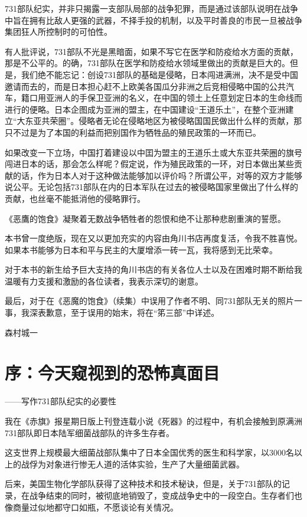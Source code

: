 \documentclass[a4paper,12pt,UTF8,twoside]{ctexbook}
\begin{document}
731部队纪实，并非只揭露一支部队局部的战争犯罪，而是通过该部队说明在战争中旨在拥有比敌人更强的武器，不择手投的机制，以及平时善良的市民一旦被战争集团狂人所控制时的可怕性。

有人批评说，731部队不光是黑暗面，如果不写它在医学和防疫给水方面的贡献，那是不公平的。的确，731部队在医学和防疫给水领域里做出的贡献是巨大的。但是，我们绝不能忘记：创设731部队的基础是侵略，日本闯进满洲，决不是受中国邀请而去的，而是日本担心赶不上欧美各国瓜分非洲之后竞相侵略中国的公共汽车，籍口用亚洲人的手保卫亚洲的名义，在中国的领土上任意划定日本的生命线而进行的便略。日本企图成为亚洲的盟主，在中国建设“王道乐土”，在整个亚洲建立“大东亚共荣圈”。侵略者无论在侵略地区为被侵略国国民做出什么样的贡献，那只不过是为了本国的利益而把别国作为牺牲品的殖民政策的一环而已。

如果改变一下立场，中国打着建设以中囯为盟主的王道乐土或大东亚共荣圈的旗号闯进日本的话，那会怎么样呢？假定说，作为殖民政策的一环，对日本做出某些贡献的话，作为日本人对于这种做法能够加以评价吗？所谓公平，对等的双方才能够说公平。无论包括731部队在内的日本军队在过去的被侵略国家里做出了什么样的贡献，也丝毫不能抵消他的侵略罪行。

《恶鷹的饱食》凝聚着无数战争牺牲者的怨恨和绝不让那种悲剧重演的誓愿。

本书曾一度绝版，现在又以更加充实的内容由角川书店再度复活，令我不胜喜悦。如果本书能够为日本和平与民主的大厦增添一砖一瓦，我将感到无比荣幸。

对于本书的新生给予巨大支持的角川书店的有关各位人士以及在困难时期不断给我温暖有力支援和激励的各位读者，我表示深切的谢意。

最后，对于在《恶魔的饱食》（续集）中误用了作者不明、同731部队无关的照片一事，我深表歉意，至于误用的始末，将在“笫三部”中详述。

森村城一

\chapter{序：今天窥视到的恐怖真面目}

——写作731部队纪实的必要性

我在《赤旗》报星期日版上刊登连载小说《死器》的过程中，有机会接触到原满洲731部队即日本陆军细菌战部队的许多生存者。

这支世界上规模最大细菌战部队集中了日本全国优秀的医生和科学家，以3000名以上的战俘为对象进行惨无人道的活体实验，生产了大量细菌武器。

后来，美国生物化学部队获得了这种技术和技术秘诀，但是，关于731部队的记录，在战争结束的同时，被彻底地销毁了，变成战争史中的一段空白。生存者们也像商量过似地都守口如瓶，不愿谈论有关情况。
\end{document}
